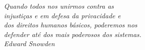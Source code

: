 \begin{epigrafe}
\vspace*{\fill}
\begin{flushright}
\textit{Quando todos nos unirmos contra as \\
injustiças e em defesa da privacidade e \\
dos direitos humanos básicos, poderemos nos \\
defender até dos mais poderosos dos sistemas. \\}
\vspace{3mm}
\textit{Edward Snowden}
\end{flushright}
\end{epigrafe}